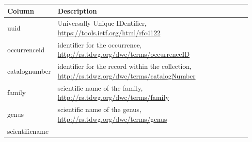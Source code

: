 \documentclass[
]{book}
\begin{document}
\begin{longtable}[]{@{}ll@{}}
\toprule
\begin{minipage}[b]{0.47\columnwidth}\raggedright
Column\strut
\end{minipage} & \begin{minipage}[b]{0.47\columnwidth}\raggedright
Description\strut
\end{minipage}\tabularnewline
\midrule
\endhead
\begin{minipage}[t]{0.47\columnwidth}\raggedright
uuid\strut
\end{minipage} & \begin{minipage}[t]{0.47\columnwidth}\raggedright
Universally Unique IDentifier, \url{https://tools.ietf.org/html/rfc4122}\strut
\end{minipage}\tabularnewline
\begin{minipage}[t]{0.47\columnwidth}\raggedright
occurrenceid\strut
\end{minipage} & \begin{minipage}[t]{0.47\columnwidth}\raggedright
identifier for the occurrence, \url{http://rs.tdwg.org/dwc/terms/occurrenceID}\strut
\end{minipage}\tabularnewline
\begin{minipage}[t]{0.47\columnwidth}\raggedright
catalognumber\strut
\end{minipage} & \begin{minipage}[t]{0.47\columnwidth}\raggedright
identifier for the record within the collection, \url{http://rs.tdwg.org/dwc/terms/catalogNumber}\strut
\end{minipage}\tabularnewline
\begin{minipage}[t]{0.47\columnwidth}\raggedright
family\strut
\end{minipage} & \begin{minipage}[t]{0.47\columnwidth}\raggedright
scientific name of the family, \url{http://rs.tdwg.org/dwc/terms/family}\strut
\end{minipage}\tabularnewline
\begin{minipage}[t]{0.47\columnwidth}\raggedright
genus\strut
\end{minipage} & \begin{minipage}[t]{0.47\columnwidth}\raggedright
scientific name of the genus, \url{http://rs.tdwg.org/dwc/terms/genus}\strut
\end{minipage}\tabularnewline
\begin{minipage}[t]{0.47\columnwidth}\raggedright
scientificname\strut
\end{minipage} & \begin{minipage}[t]{0.47\columnwidth}\raggedright

\end{minipage}
\end{longtable}
\end{document}
